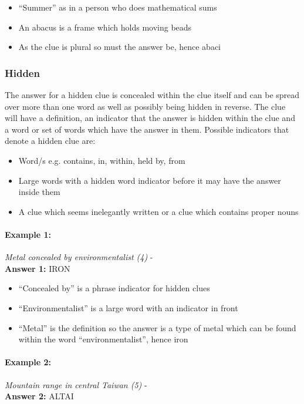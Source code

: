 \begin{itemize}
  \item ``Summer'' as in a person who does mathematical sums 
  \item An abacus is a frame which holds moving beads 
  \item As the clue is plural so must the answer be, hence abaci
\end{itemize}


\subsubsection{Hidden}  

The answer for a hidden clue is concealed within the clue itself and can be
spread over more than one word as well as possibly being hidden in reverse. The
clue will have a definition, an indicator that the answer is hidden within the
clue and a word or set of words which have the answer in them. Possible 
indicators that denote a hidden clue are:

\begin{itemize} 
  \item Word/s e.g. contains, in, within, held by, from 
  \item Large words with a hidden word indicator before it may have the answer 
        inside them 
  \item A clue which seems inelegantly written or a clue which contains proper 
        nouns  
\end{itemize}

\paragraph{Example 1:} \emph{Metal concealed by environmentalist (4)} - \citep{shuchiHidden08} \\
\textbf{Answer 1:} IRON 

\begin{itemize}
  \item ``Concealed by'' is a phrase indicator for hidden clues 
  \item ``Environmentalist'' is a large word with an indicator in front 
  \item ``Metal'' is the definition so the answer is a type of metal which can
        be found within the word ``environmentalist'', hence iron 
\end{itemize}


\paragraph{Example 2:} \emph{Mountain range in central Taiwan (5)} - \citep{shuchiHidden08} \\
\textbf{Answer 2:} ALTAI 

